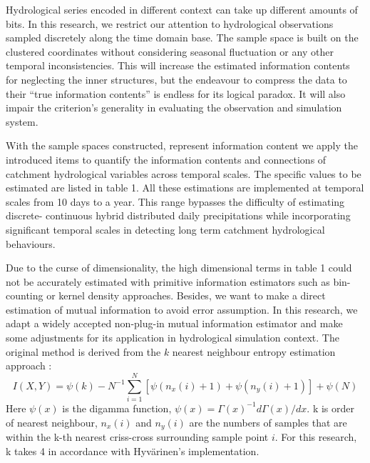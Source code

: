 Hydrological series encoded in different context can take 
up different amounts of bits. In this research, we restrict 
our attention to hydrological observations sampled 
discretely along the time domain base. The sample space is 
built on the clustered coordinates without considering 
seasonal fluctuation or any other temporal inconsistencies. 
This will increase the estimated information contents for 
neglecting the inner structures, but the endeavour to 
compress the data to their ``true information contents'' is 
endless for its logical paradox\citep{li2009introduction}. 
It will also impair the criterion's generality in 
evaluating the observation and simulation system.  

 


With the sample spaces constructed,
represent information content
we apply the introduced items to quantify the information 
contents and connections of catchment hydrological 
variables across temporal scales. The specific values to be 
estimated are listed in table 1. All these estimations are 
implemented at temporal scales from 10 days to a year. This 
range  bypasses the difficulty of estimating discrete-
continuous hybrid distributed daily precipitations\citep
{gong2014estimating} while incorporating significant 
temporal scales in detecting long term catchment 
hydrological behaviours. 

Due to the curse of dimensionality, the high dimensional 
terms in table 1 could not be accurately estimated with 
primitive information estimators such as bin-counting or 
kernel density approaches. Besides, we want to make a 
direct estimation of mutual information to avoid  error 
assumption. In this research, we adapt a widely accepted 
non-plug-in mutual information estimator and make some 
adjustments for its application in hydrological simulation 
context. The original method is derived from the $k$ 
nearest neighbour entropy estimation approach \citep
{kraskov2004estimating}:
\begin{equation}\label{Kraskov}
I(X,Y)=\psi(k)-N^{-1}\sum_{i=1}^{N}[\psi(n_x(i)+1)+\psi
(n_y(i)+1)]+\psi(N)
\end{equation}
Here $\psi(x)$ is the digamma function, $\psi(x)=\Gamma(x)
^{-1}d\Gamma(x)/dx$. k is order of nearest neighbour, $n_x
(i)$ and $n_y(i)$ are the numbers of samples that are 
within the k-th nearest  criss-cross surrounding sample 
point $i$. For this research, k takes 4 in accordance with 
Hyv{\"a}rinen's implementation.

